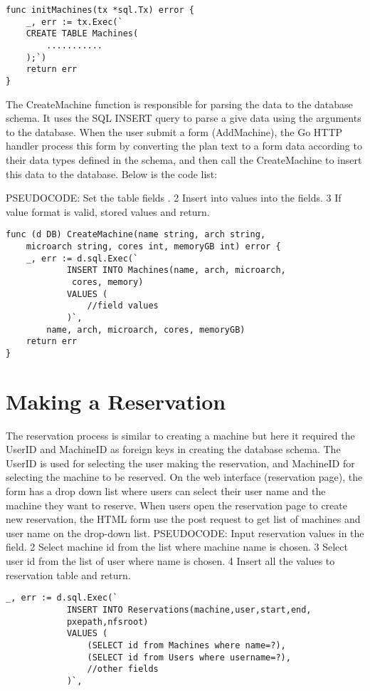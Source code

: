 \begin{lstlisting}[caption=Creating Database for machine, label=Initializing database]
func initMachines(tx *sql.Tx) error {
	_, err := tx.Exec(`
	CREATE TABLE Machines(
		...........
	);`)
	return err
}
\end{lstlisting}

The CreateMachine function is responsible for parsing the data to the database schema. It uses the SQL INSERT query to parse a give data using the arguments to the database. When the user submit a form (AddMachine), the Go HTTP handler process this form by converting the plan text to a form data according to their data types defined in the schema, and then call the CreateMachine to insert this data to the database. Below is the code list:

PSEUDOCODE: Set the table fields .
2 Insert into values into the fields.
3 If value format is valid, stored values and return.

\begin{lstlisting}[caption=Adding machines details, label=Adding machine]
func (d DB) CreateMachine(name string, arch string,
	microarch string, cores int, memoryGB int) error {
	_, err := d.sql.Exec(`
			INSERT INTO Machines(name, arch, microarch,
			 cores, memory)
			VALUES (
				//field values
			)`,
		name, arch, microarch, cores, memoryGB)
	return err
}
\end{lstlisting}

\section*{Making a Reservation}
The reservation process is similar to creating a machine but here it required the UserID and MachineID as foreign keys in creating the database schema. The UserID is used for selecting  the user making the reservation, and MachineID for selecting the machine to be reserved. On the web interface (reservation page), the form has a drop down list where users can select their user name and the machine they want to reserve. When users open the reservation page to create new reservation, the HTML form use the post request to get list of machines and user name on the drop-down list.
PSEUDOCODE: Input reservation values in the field.
2 Select machine id from the list where machine name is chosen.
3 Select user id from the list of user where name is chosen.
4 Insert all the values to reservation table and return.
\begin{lstlisting}[caption=Storing Reservation details, label=Adding reservation]
	_, err := d.sql.Exec(`
			INSERT INTO Reservations(machine,user,start,end,
			pxepath,nfsroot)
			VALUES (
				(SELECT id from Machines where name=?),
				(SELECT id from Users where username=?),
				//other fields
			)`,
\end{lstlisting}

